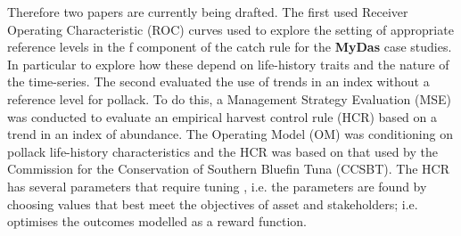 Therefore two papers are currently being drafted. The first used Receiver Operating Characteristic (ROC) curves used to explore the setting of appropriate reference levels in the f component of the catch rule for the \textbf{MyDas} case studies. In particular to explore how these depend on life-history traits and the nature of the time-series. The second evaluated the use of trends in an index without a reference level for pollack. To do this, a Management Strategy Evaluation (MSE) was conducted to evaluate an empirical harvest control rule (HCR) based on a trend in an index of
abundance. The Operating Model (OM) was conditioning on pollack life-history characteristics and the HCR was based on that used by the Commission for the Conservation of Southern Bluefin Tuna (CCSBT). The HCR has several parameters that require tuning \citep{hillary2015scientific}, i.e. the parameters are found by choosing values that best meet the objectives of asset and stakeholders; i.e. optimises the outcomes modelled as a reward function.

